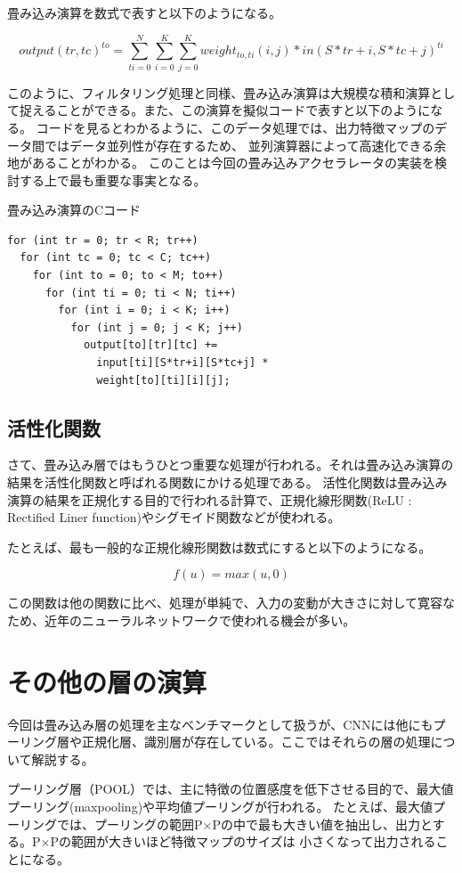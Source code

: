 畳み込み演算を数式で表すと以下のようになる。

\[
  output(tr, tc)^{to} = \sum_{ti=0}^{N} \sum_{i=0}^{K} \sum_{j=0}^{K} weight_{to, ti}(i, j) * in(S * tr + i, S * tc + j)^{ti}
\]

このように、フィルタリング処理と同様、畳み込み演算は大規模な積和演算として捉えることができる。また、この演算を擬似コードで表すと以下のようになる。
コードを見るとわかるように、このデータ処理では、出力特徴マップのデータ間ではデータ並列性が存在するため、
並列演算器によって高速化できる余地があることがわかる。
このことは今回の畳み込みアクセラレータの実装を検討する上で最も重要な事実となる。

\begin{itembox}[1]{畳み込み演算のCコード}
\begin{verbatim}
for (int tr = 0; tr < R; tr++)
  for (int tc = 0; tc < C; tc++)
    for (int to = 0; to < M; to++)
      for (int ti = 0; ti < N; ti++)
        for (int i = 0; i < K; i++)
          for (int j = 0; j < K; j++)
            output[to][tr][tc] +=
              input[ti][S*tr+i][S*tc+j] *
              weight[to][ti][i][j];
\end{verbatim}
\end{itembox}

\subsection{活性化関数}
さて、畳み込み層ではもうひとつ重要な処理が行われる。それは畳み込み演算の結果を活性化関数と呼ばれる関数にかける処理である。
活性化関数は畳み込み演算の結果を正規化する目的で行われる計算で、正規化線形関数(ReLU : Rectified Liner function)やシグモイド関数などが使われる。

たとえば、最も一般的な正規化線形関数は数式にすると以下のようになる。

\[
  f(u) = max(u, 0)
\]

この関数は他の関数に比べ、処理が単純で、入力の変動が大きさに対して寛容なため、近年のニューラルネットワークで使われる機会が多い。

\section{その他の層の演算}
今回は畳み込み層の処理を主なベンチマークとして扱うが、CNNには他にもプーリング層や正規化層、識別層が存在している。ここではそれらの層の処理について解説する。

プーリング層（POOL）では、主に特徴の位置感度を低下させる目的で、最大値プーリング(maxpooling)や平均値プーリングが行われる。
たとえば、最大値プーリングでは、プーリングの範囲P×Pの中で最も大きい値を抽出し、出力とする。P×Pの範囲が大きいほど特徴マップのサイズは
小さくなって出力されることになる。

